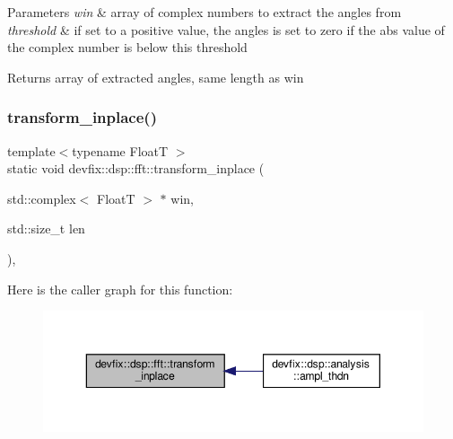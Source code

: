 \begin{DoxyParams}{Parameters}
{\em win} & array of complex numbers to extract the angles from \\
\hline
{\em threshold} & if set to a positive value, the angles is set to zero if the abs value of the complex number is below this threshold \\
\hline
\end{DoxyParams}
\begin{DoxyReturn}{Returns}
array of extracted angles, same length as win 
\end{DoxyReturn}
\mbox{\label{structdevfix_1_1dsp_1_1fft_af0c91dff74868f580ad295448e50693f}} 
\subsubsection{\texorpdfstring{transform\+\_\+inplace()}{transform\_inplace()}\hspace{0.1cm}{\footnotesize\ttfamily [1/3]}}
{\footnotesize\ttfamily template$<$typename FloatT $>$ \\
static void devfix\+::dsp\+::fft\+::transform\+\_\+inplace (\begin{DoxyParamCaption}\item[{std\+::complex$<$ FloatT $>$ $\ast$}]{win,  }\item[{std\+::size\+\_\+t}]{len }\end{DoxyParamCaption})\hspace{0.3cm}{\ttfamily [inline]}, {\ttfamily [static]}}

Here is the caller graph for this function\+:\nopagebreak
\begin{figure}[H]
\begin{center}
\leavevmode
\includegraphics[width=350pt]{structdevfix_1_1dsp_1_1fft_af0c91dff74868f580ad295448e50693f_icgraph}
\end{center}
\end{figure}
\mbox{\label{structdevfix_1_1dsp_1_1fft_ae3d7d5529ffad8aa929c5353252df7f5}} 
